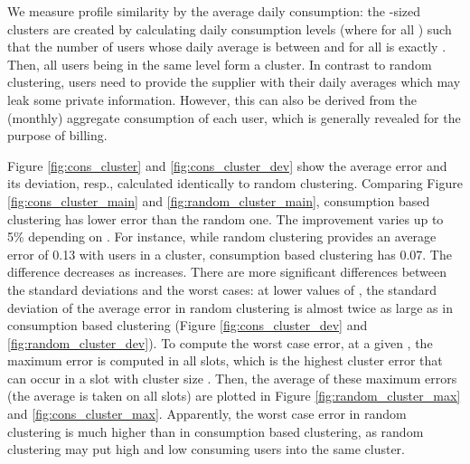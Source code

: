 \documentclass[11pt,a4paper]{article}
\theoremstyle{plain}
\theoremstyle{plain}
\theoremstyle{plain}
\theoremstyle{plain}
\theoremstyle{nonumberplain} \theoremseparator{}
\begin{document}
We measure profile similarity by the average daily consumption: the -sized clusters are created by calculating daily consumption levels  (where  for all ) such that the number of users whose daily average is between  and  for all  is exactly . Then, all users being in the same level form a cluster.  
In contrast to random clustering, users need to provide the supplier with their daily averages which may leak some private information. However, this can also be derived from the (monthly) aggregate consumption of each user, which is generally revealed for the purpose of billing.

Figure \ref{fig:cons_cluster} and \ref{fig:cons_cluster_dev} show the average error and its deviation, resp., calculated identically to random clustering. Comparing Figure \ref{fig:cons_cluster_main} and \ref{fig:random_cluster_main}, consumption based clustering has lower error than the random one. The improvement varies up to 5\% depending on .
For instance, while random clustering provides an average error of 0.13 with  users in a cluster, consumption based clustering has 0.07. The difference decreases as  increases. There are more significant  differences between the standard deviations and the worst cases: at lower values of , the standard deviation of the average error in random clustering is almost twice as large as in consumption based clustering (Figure \ref{fig:cons_cluster_dev} and \ref{fig:random_cluster_dev}). To compute the worst case error, at a given , the maximum error is computed in all slots, which is the highest cluster error that can occur in a slot with cluster size . Then, the average of these maximum errors (the average is taken on all slots) are plotted in Figure \ref{fig:random_cluster_max} and \ref{fig:cons_cluster_max}. Apparently, the worst case error in random clustering is much higher than in consumption based clustering, as random clustering may put high and low consuming users into the same cluster.  


\begin{figure*}[ht]
\centering
{}
\caption{The error depending on  using consumption based clustering.  is 10 min. \label{fig:cons_cluster_main} 
}
\end{figure*}
\end{document}

